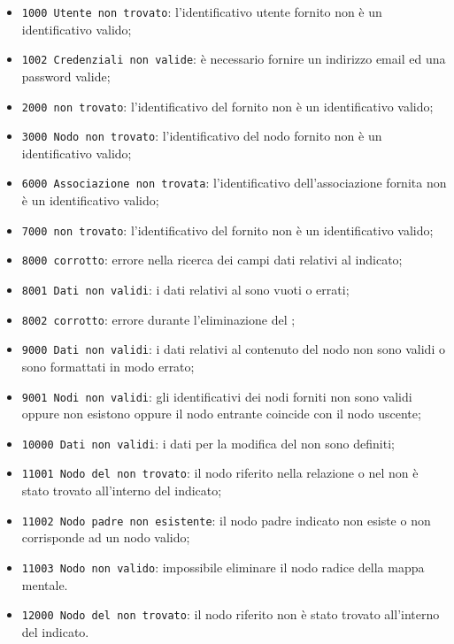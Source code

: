 \begin{itemize}
\item \texttt{1000 Utente non trovato}: l'identificativo utente fornito non è un identificativo valido;
\item \texttt{1002 Credenziali non valide}: è necessario fornire un indirizzo email ed una password valide;
\item \texttt{2000  non trovato}: l'identificativo del  fornito non è un identificativo valido;
\item \texttt{3000 Nodo non trovato}: l'identificativo del nodo fornito non è un identificativo valido;
\item \texttt{6000 Associazione non trovata}: l'identificativo dell'associazione fornita non è un identificativo valido;
\item \texttt{7000  non trovato}: l'identificativo del  fornito non è un identificativo valido;
\item \texttt{8000  corrotto}: errore nella ricerca dei campi dati relativi al  indicato;
\item \texttt{8001 Dati non validi}: i dati relativi al  sono vuoti o errati;
\item \texttt{8002  corrotto}: errore durante l'eliminazione del ;
\item \texttt{9000 Dati non validi}: i dati relativi al contenuto del nodo non sono validi o sono formattati in modo errato;
\item \texttt{9001 Nodi non validi}: gli identificativi dei nodi forniti non sono validi oppure non esistono oppure il nodo entrante coincide con il nodo uscente;
\item \texttt{10000 Dati non validi}: i dati per la modifica del  non sono definiti;
\item \texttt{11001 Nodo del  non trovato}: il nodo riferito nella relazione o nel  non è stato trovato all'interno del  indicato;
\item \texttt{11002 Nodo padre non esistente}: il nodo padre indicato non esiste o non corrisponde ad un nodo valido;
\item \texttt{11003 Nodo non valido}: impossibile eliminare il nodo radice della mappa mentale.
\item \texttt{12000 Nodo del  non trovato}: il nodo riferito non è stato trovato all'interno del  indicato.
\end{itemize}
